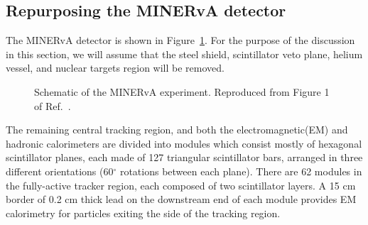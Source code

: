 \subsection{Repurposing the MINERvA detector}
\label{sec:minerva}
The MINERvA detector is shown in Figure~\ref{fig:minerva_detector}. For the purpose of the discussion in this section, we will assume that the steel shield, scintillator veto plane, helium vessel, and nuclear targets region will be removed. 
\begin{figure}[htb]
  \centering
  \caption{Schematic of the MINERvA experiment. Reproduced from Figure 1 of Ref.~\cite{minerva-nim}.}
  \label{fig:minerva_detector}
\end{figure}

The remaining central tracking region, and both the electromagnetic(EM) and hadronic calorimeters are divided into modules which consist mostly of hexagonal scintillator planes, each made of 127 triangular scintillator bars, arranged in three different orientations (60$^\circ$ rotations between each plane). There are 62 modules in the fully-active tracker region, each composed of two scintillator layers. A 15 cm border of 0.2 cm thick lead on the downstream end of each module provides EM calorimetry for particles exiting the side of the tracking region.

